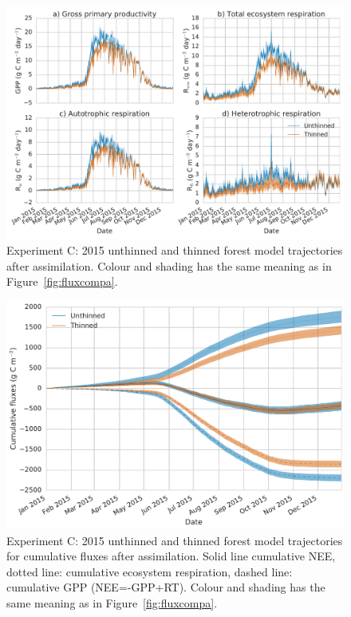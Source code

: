 \documentclass[draft,jgrga]{agutexSI}
\begin{document}
  \begin{figure}
 \noindent\includegraphics[width=40pc]{flux_compc.pdf}
\caption{Experiment C: 2015 unthinned and thinned forest model trajectories after assimilation. Colour and shading has the same meaning as in Figure~\ref{fig:fluxcompa}.}
 \label{fig:fluxcompc}
 \end{figure}
 
  \begin{figure}
 \noindent\includegraphics[width=40pc]{cum_fluxc.pdf}
\caption{Experiment C: 2015 unthinned and thinned forest model trajectories for cumulative fluxes after assimilation. Solid line cumulative NEE, dotted line: cumulative ecosystem respiration, dashed line: cumulative GPP (NEE=-GPP+RT). Colour and shading has the same meaning as in Figure~\ref{fig:fluxcompa}.}
 \label{fig:fluxcumc}
 \end{figure}
 
\end{document}
